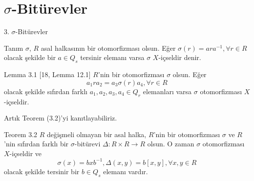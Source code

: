 \documentclass{beamer}
\begin{document}
\section{\texorpdfstring{$\sigma$}{Lg}-Bitürevler}

\begin{frame}{3. $\sigma$-Bitürevler}
    
\begin{block}{Tanım}
$\sigma$, $R$ asal halkasının bir otomorfizması olsun. Eğer $\sigma(r) = ara^{-1}, \forall r \in R$ olacak şekilde bir $a \in Q_s$ tersinir elemanı varsa $\sigma$ $X$-içseldir denir.
\end{block}
    
\end{frame}

\begin{frame}

\begin{block}{Lemma 3.1 [18, Lemma 12.1]}
$R$'nin bir otomorfizması $\sigma$ olsun. Eğer
\begin{equation*}
    a_1ra_2 = a_3\sigma(r)a_4, \forall r \in R
\end{equation*}
olacak şekilde sıfırdan farklı $a_1, a_2, a_3, a_4 \in Q_r$ elemanları varsa $\sigma$ otomorfizması $X$-içseldir.
\end{block}

Artık Teorem (3.2)'yi kanıtlayabiliriz.
    
\end{frame}

\begin{frame}

\begin{block}{Teorem 3.2}
$R$ değişmeli olmayan bir asal halka, $R$'nin bir otomorfizması $\sigma$ ve $R$'nin sıfırdan farklı bir $\sigma$-bitürevi $\Delta \colon R \times R \to R$ olsun. O zaman $\sigma$ otomorfizması $X$-içseldir ve
\begin{equation*}
    \sigma(x) = bxb^{-1}, \Delta(x,y) = b[x,y], \forall x, y \in R
\end{equation*}
olacak şekilde tersinir bir $b \in Q_s$ elemanı vardır.
\end{block}
    
\end{frame}
\end{document}
